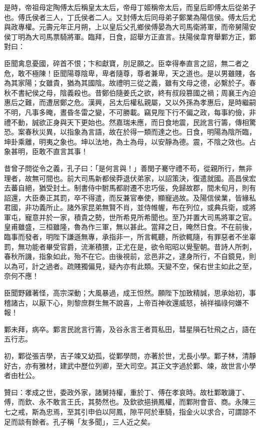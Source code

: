 \begin{pinyinscope}
是時，帝祖母定陶傅太后稱皇太太后，帝母丁姬稱帝太后，而皇后即傅太后從弟子也。傅氏侯者三人，丁氏侯者二人。又封傅太后同母弟子鄭業為陽信侯。傅太后尤與政專權。元壽元年正月朔，上以皇后父孔鄉侯傅晏為大司馬衛將軍，而帝舅陽安侯丁明為大司馬票騎將軍。臨拜，日食，詔舉方正直言。扶陽侯韋育舉鄴方正，鄴對曰：

臣聞禽息憂國，碎首不恨；卞和獻寶，刖足願之。臣幸得奉直言之詔，無二者之危，敢不極陳！臣聞陽尊陰卑，卑者隨尊，尊者兼卑，天之道也。是以男雖賤，各為其家陽；女雖貴，猶為其國陰。故禮明三從之義，雖有文母之德，必繫於子。春秋不書紀侯之母，陰義殺也。昔鄭伯隨姜氏之欲，終有叔段篡國之禍；周襄王內迫惠后之難，而遭居鄭之危。漢興，呂太后權私親屬，又以外孫為孝惠后，是時繼嗣不明，凡事多晻，晝昏冬雷之變，不可勝載。竊見陛下行不偏之政，每事約儉，非禮不動，誠欲正身與天下更始也。然嘉瑞未應，而日食地震，民訛言行籌，傳相驚恐。案春秋災異，以指象為言語，故在於得一類而達之也。日食，明陽為陰所臨，坤卦乘離，明夷之象也。坤以法地，為土為母，以安靜為德。震，不陰之效也。占象甚明，臣敢不直言其事！

昔曾子問從令之義，孔子曰：「是何言與！」善閔子騫守禮不苟，從親所行，無非理者，故無可間也。前大司馬新都侯莽退伏弟家，以詔策決，復遣就國。高昌侯宏去蕃自絕，猶受封土。制書侍中駙馬都尉遷不忠巧佞，免歸故郡，間未旬月，則有詔還，大臣奏正其罰，卒不得遣，而反兼官奉使，顯寵過故。及陽信侯業，皆緣私君國，非功義所止。諸外家昆弟無賢不肖，並侍帷幄，布在列位，或典兵衛，或將軍屯，寵意并於一家，積貴之勢，世所希見所希聞也。至乃并置大司馬將軍之官。皇甫雖盛，三桓雖隆，魯為作三軍，無以甚此。當拜之日，晻然日食。不在前後，臨事而發者，明陛下謙遜無專，承指非一，所言輒聽，所欲輒隨，有罪惡者不坐辜罰，無功能者畢受官爵，流漸積猥，正尤在是，欲令昭昭以覺聖朝。昔詩人所刺，春秋所譏，指象如此，殆不在它。由後視前，忿邑非之，逮身所行，不自鏡見，則以為可，計之過者。疏賤獨偏見，疑內亦有此類。天變不空，保右世主如此之至，奈何不應！

臣聞野雞著怪，高宗深動；大風暴過，成王怛然。願陛下加致精誠，思承始初，事稽諸古，以厭下心，則黎庶群生無不說喜，上帝百神收還威怒，禎祥福祿何嫌不報！

鄴未拜，病卒。鄴言民訛言行籌，及谷永言王者買私田，彗星隕石牡飛之占，語在五行志。

初，鄴從張吉學，吉子竦又幼孤，從鄴學問，亦著於世，尤長小學。鄴子林，清靜好古，亦有雅材，建武中歷位列卿，至大司空。其正文字過於鄴、竦，故世言小學者由杜公。

贊曰：孝成之世，委政外家，諸舅持權，重於丁、傅在孝哀時。故杜鄴敢譏丁、傅，而欽、永不敢言王氏，其勢然也。及欽欲挹損鳳權，而鄴附會音、商。永陳三七之戒，斯為忠焉，至其引申伯以阿鳳，隙平阿於車騎，指金火以求合，可謂諒不足而談有餘者。孔子稱「友多聞」，三人近之矣。


\end{pinyinscope}